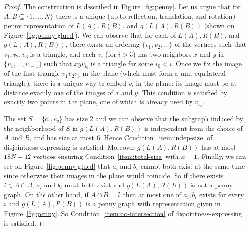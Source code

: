 \documentclass[a4paper,reqno, 12pt]{amsart}
\newcommand{\formerepsilon}{\kappa}
\begin{document}
\begin{proof}
  The construction is described in Figure~\ref{fig:penny}. Let
  us argue that for $A,B\subseteq \{1, \ldots, N\}$ there is a unique
  (up to reflection, translation, and rotation) penny representation
  of $L(A), R(B)$, and $g(L(A), R(B))$ (shown on Figure~\ref{fig:penny
    glued}).  
  We can observe that for each of $L(A), R(B)$, and $g(L(A), R(B))$, there exists an ordering $\{v_1,v_2,
  \ldots\}$ of the vertices such that $v_1, v_2, v_3$ is
  a triangle, and each $v_i$ (for $i>3$) has two neighbors $x$ and $y$
  in $\{v_1, \ldots, v_{i-1}\}$ such that $xyv_{i_0}$ is a triangle
  for some $i_0<i$. Once we fix the image of the first triangle
  $v_1v_2v_3$ in the plane (which must
  form a unit equilateral triangle), there is a unique way to embed
   $v_i$ in the plane: its image must be at distance
  exactly one of the images of $x$ and $y$. This condition  is satisfied by
  exactly two points in the plane, one of which is already used by
  $v_{i_0}$.

The set $S=\{c_1, c_2\}$ has size 2 and we can observe that the
subgraph induced by the neighborhood of $S$ in $g(L(A), R(B))$ is
independent from the choice of $A$ and $B$, and has size at most 6. Hence Condition~\ref{item:indep-size} of disjointness-expressing is satisfied.
Moreover $g(L(A), R(B))$ has at most $18N+12$ vertices ensuring Condition~\ref{item:total-size} with $\formerepsilon=1$.
Finally, we can see on Figure~\ref{fig:penny glued} that $a_i$ and
$b_i$ cannot both exist at the same time since otherwise their images
in the plane would coincide.
So if there exists $i\in A\cap B$, $a_i$ and $b_i$ must both exist and
$g(L(A), R(B))$ is not a penny graph. On the other hand, if $A\cap B =\emptyset$ then at most one of $a_i, b_i$ exists for every $i$ and $g(L(A), R(B))$ is a penny graph with representation given in Figure~\ref{fig:penny}. So Condition~\ref{item:no-intersection} of disjointness-expressing is satisfied.
\end{proof}
\end{document}
